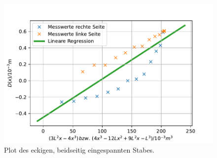 \begin{figure}[H]
  \centering
  \includegraphics{pictures/Lineare Regression4.pdf}
  \caption{Plot des eckigen, beidseitig eingespannten Stabes.}
  \label{fig:plot4}
\end{figure}